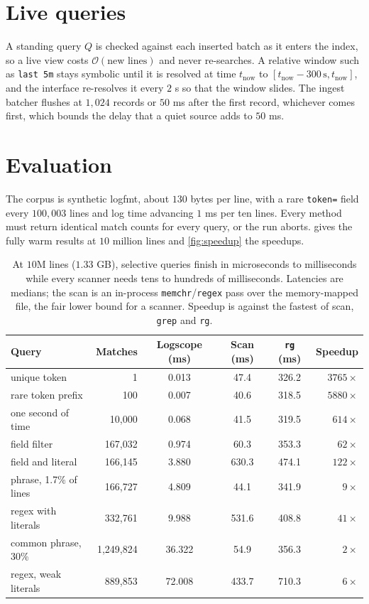 \documentclass[11pt]{article}
\theoremstyle{plain}
\theoremstyle{definition}
\theoremstyle{remark}
\newcommand{\code}[1]{\texttt{#1}}
\newcommand{\bigO}[1]{\mathcal{O}\!\left(#1\right)}
\begin{document}
\section{Live queries}\label{sec:live}

A standing query $Q$ is checked against each inserted batch as it enters the
index, so a live view costs $\bigO{\text{new lines}}$ and never re-searches. A
relative window such as \code{last 5m} stays symbolic until it is resolved at
time $t_{\text{now}}$ to $[t_{\text{now}} - 300\,\text{s}, t_{\text{now}}]$, and the
interface re-resolves it every $2$ s so that the window slides. The ingest batcher
flushes at $1{,}024$ records or $50$ ms after the first record, whichever comes
first, which bounds the delay that a quiet source adds to $50$ ms.

\section{Evaluation}\label{sec:eval}

The corpus is synthetic logfmt, about $130$ bytes per line, with a rare
\code{token=} field every $100{,}003$ lines and log time advancing $1$ ms per ten
lines. Every method must return identical match counts for every query, or the
run aborts.  gives the fully warm results at $10$ million lines and
\cref{fig:speedup} the speedups.

\begin{table}[htbp]
\centering
\caption{At $10$M lines ($1.33$ GB), selective queries finish in microseconds
to milliseconds while every scanner needs tens to hundreds of milliseconds.
Latencies are medians; the scan is an in-process \code{memchr}/\code{regex}
pass over the memory-mapped file, the fair lower bound for a scanner. Speedup is
against the fastest of scan, \code{grep} and \code{rg}.}
\label{tab:10m}
\small
\begin{tabular}{l r S[table-format=2.3] S[table-format=3.1] S[table-format=3.1] r}
\toprule
Query & Matches & {Logscope (ms)} & {Scan (ms)} & {\code{rg} (ms)} & Speedup \\
\midrule
unique token           & 1         & 0.013  & 47.4  & 326.2 & $3765\times$ \\
rare token prefix      & 100       & 0.007  & 40.6  & 318.5 & $5880\times$ \\
one second of time     & 10{,}000  & 0.068  & 41.5  & 319.5 & $614\times$ \\
field filter           & 167{,}032 & 0.974  & 60.3  & 353.3 & $62\times$ \\
field and literal      & 166{,}145 & 3.880  & 630.3 & 474.1 & $122\times$ \\
phrase, 1.7\% of lines & 166{,}727 & 4.809  & 44.1  & 341.9 & $9\times$ \\
regex with literals    & 332{,}761 & 9.988  & 531.6 & 408.8 & $41\times$ \\
common phrase, 30\%    & 1{,}249{,}824 & 36.322 & 54.9 & 356.3 & $2\times$ \\
regex, weak literals   & 889{,}853 & 72.008 & 433.7 & 710.3 & $6\times$ \\
\bottomrule
\end{tabular}
\end{table}
\end{document}
